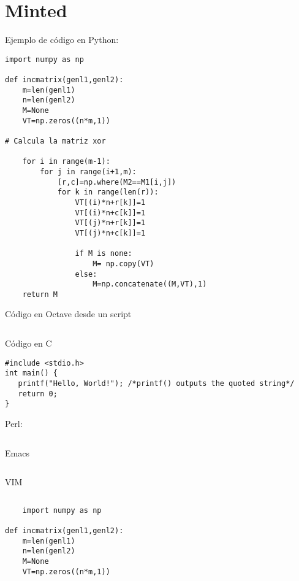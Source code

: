 \section{Minted}

Ejemplo de código en Python:

\begin{verbatim}
import numpy as np

def incmatrix(genl1,genl2):
    m=len(genl1)
    n=len(genl2)
    M=None
    VT=np.zeros((n*m,1))

# Calcula la matriz xor

    for i in range(m-1):
        for j in range(i+1,m):
            [r,c]=np.where(M2==M1[i,j])
            for k in range(len(r)):
                VT[(i)*n+r[k]]=1
                VT[(i)*n+c[k]]=1
                VT[(j)*n+r[k]]=1
                VT[(j)*n+c[k]]=1

                if M is none:
                    M= np.copy(VT)
                else:
                    M=np.concatenate((M,VT),1)
    return M
\end{verbatim}


Código en Octave desde un script

\inputminted[bgcolor=LightGray]{octave}{bitxorM.m}

Código en C

\begin{verbatim}
#include <stdio.h>
int main() {
   printf("Hello, World!"); /*printf() outputs the quoted string*/
   return 0;
}
\end{verbatim}

Perl:
\inputminted[bgcolor=LightGray]{perl}{bitxorM.m}

Emacs
\inputminted[]{emacs}{bitxorM.m}

VIM
\inputminted[]{vim}{bitxorM.m}

\begin{verbatim}
    import numpy as np

def incmatrix(genl1,genl2):
    m=len(genl1)
    n=len(genl2)
    M=None
    VT=np.zeros((n*m,1))
\end{verbatim}

